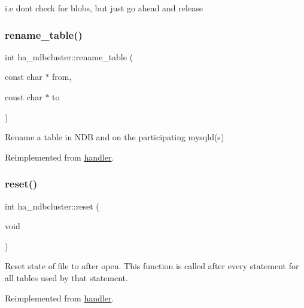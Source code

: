i.\+e don\textquotesingle{}t check for blobs, but just go ahead and release\mbox{\label{classha__ndbcluster_a5609bf8b91966dacc3610fc7ceffc314}} 
\subsubsection{\texorpdfstring{rename\+\_\+table()}{rename\_table()}}
{\footnotesize\ttfamily int ha\+\_\+ndbcluster\+::rename\+\_\+table (\begin{DoxyParamCaption}\item[{const char $\ast$}]{from,  }\item[{const char $\ast$}]{to }\end{DoxyParamCaption})\hspace{0.3cm}{\ttfamily [virtual]}}

Rename a table in N\+DB and on the participating mysqld(s) 

Reimplemented from \mbox{\hyperlink{classhandler_a58bf8fa32d87654794e6b1c3b3fb8d32}{handler}}.

\mbox{\label{classha__ndbcluster_a72ae34dfc88079bca1c85bfcd718b118}} 
\subsubsection{\texorpdfstring{reset()}{reset()}}
{\footnotesize\ttfamily int ha\+\_\+ndbcluster\+::reset (\begin{DoxyParamCaption}\item[{void}]{ }\end{DoxyParamCaption})\hspace{0.3cm}{\ttfamily [virtual]}}

Reset state of file to after \textquotesingle{}open\textquotesingle{}. This function is called after every statement for all tables used by that statement. 

Reimplemented from \mbox{\hyperlink{classhandler}{handler}}.

\mbox{\label{classha__ndbcluster_acb923144766720049d59f97cd70286fd}} 
